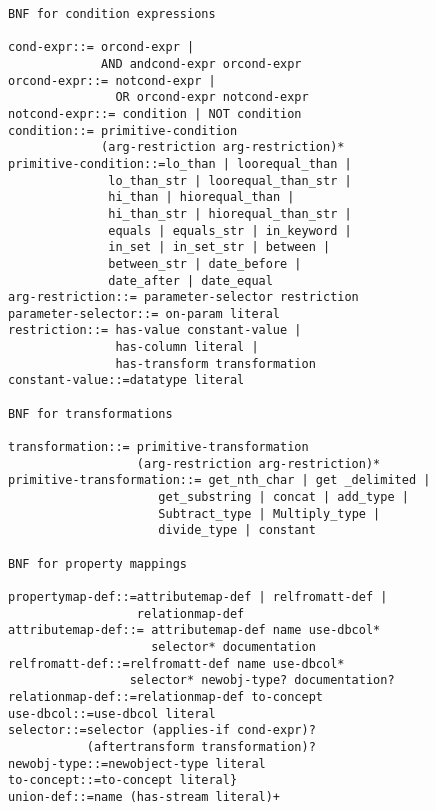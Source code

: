 \begin{lstlisting}[style=BNFStyle,language=BNF,label=list:schema,caption=Grammar of the \stwoo mapping language.]
BNF for condition expressions 

cond-expr::= orcond-expr | 
             AND andcond-expr orcond-expr
orcond-expr::= notcond-expr | 
               OR orcond-expr notcond-expr
notcond-expr::= condition | NOT condition
condition::= primitive-condition 
             (arg-restriction arg-restriction)*
primitive-condition::=lo_than | loorequal_than | 
              lo_than_str | loorequal_than_str | 
              hi_than | hiorequal_than | 
              hi_than_str | hiorequal_than_str | 
              equals | equals_str | in_keyword | 
              in_set | in_set_str | between | 
              between_str | date_before | 
              date_after | date_equal
arg-restriction::= parameter-selector restriction
parameter-selector::= on-param literal
restriction::= has-value constant-value | 
               has-column literal | 
               has-transform transformation 
constant-value::=datatype literal

BNF for transformations 

transformation::= primitive-transformation 
                  (arg-restriction arg-restriction)*
primitive-transformation::= get_nth_char | get _delimited | 
                     get_substring | concat | add_type | 
                     Subtract_type | Multiply_type | 
                     divide_type | constant

BNF for property mappings 

propertymap-def::=attributemap-def | relfromatt-def | 
                  relationmap-def
attributemap-def::= attributemap-def name use-dbcol* 
                    selector* documentation
relfromatt-def::=relfromatt-def name use-dbcol* 
                 selector* newobj-type? documentation?
relationmap-def::=relationmap-def to-concept
use-dbcol::=use-dbcol literal
selector::=selector (applies-if cond-expr)? 
           (aftertransform transformation)?
newobj-type::=newobject-type literal
to-concept::=to-concept literal}
union-def::=name (has-stream literal)+
\end{lstlisting}
